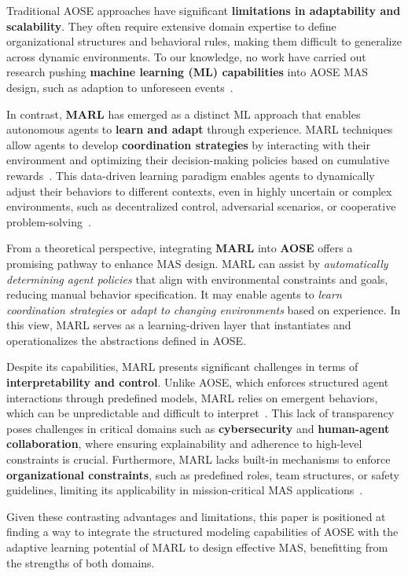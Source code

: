 \documentclass[pdflatex,sn-mathphys-num]{sn-jnl}%
\theoremstyle{thmstyleone}%
\theoremstyle{thmstyletwo}%
\theoremstyle{thmstylethree}%
\begin{document}
Traditional AOSE approaches have significant \textbf{limitations in adaptability and scalability}. They often require extensive domain expertise to define organizational structures and behavioral rules, making them difficult to generalize across dynamic environments. To our knowledge, no work have carried out research pushing \textbf{machine learning (ML) capabilities} into AOSE MAS design, such as adaption to unforeseen events~\cite{Garcia2004}.

In contrast, \textbf{MARL} has emerged as a distinct ML approach that enables autonomous agents to \textbf{learn and adapt} through experience. MARL techniques allow agents to develop \textbf{coordination strategies} by interacting with their environment and optimizing their decision-making policies based on cumulative rewards~\cite{Zhang2021}. This data-driven learning paradigm enables agents to dynamically adjust their behaviors to different contexts, even in highly uncertain or complex environments, such as decentralized control, adversarial scenarios, or cooperative problem-solving~\cite{Papoudakis2021}.

From a theoretical perspective, integrating \textbf{MARL} into \textbf{AOSE} offers a promising pathway to enhance MAS design. MARL can assist by \textit{automatically determining agent policies} that align with environmental constraints and goals, reducing manual behavior specification. It may enable agents to \textit{learn coordination strategies} or \textit{adapt to changing environments} based on experience. In this view, MARL serves as a learning-driven layer that instantiates and operationalizes the abstractions defined in AOSE.

Despite its capabilities, MARL presents significant challenges in terms of \textbf{interpretability and control}. Unlike AOSE, which enforces structured agent interactions through predefined models, MARL relies on emergent behaviors, which can be unpredictable and difficult to interpret~\cite{Du2022}. This lack of transparency poses challenges in critical domains such as \textbf{cybersecurity} and \textbf{human-agent collaboration}, where ensuring explainability and adherence to high-level constraints is crucial. Furthermore, MARL lacks built-in mechanisms to enforce \textbf{organizational constraints}, such as predefined roles, team structures, or safety guidelines, limiting its applicability in mission-critical MAS applications~\cite{Nguyen2020}.

Given these contrasting advantages and limitations, this paper is positioned at finding a way to integrate the structured modeling capabilities of AOSE with the adaptive learning potential of MARL to design effective MAS, benefitting from the strengths of both domains.
\end{document}
